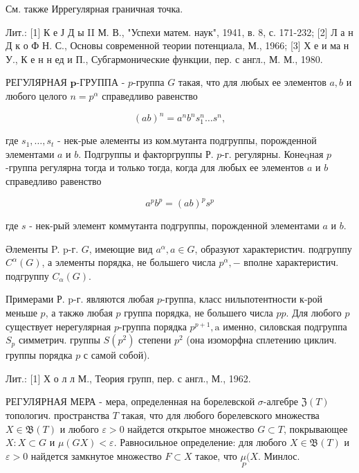 \documentclass[10pt]{article}
\begin{document}
См. также Иррегулярная граничная точка.



Лит.: [1] К е Ј Д ы II М. В., "Успехи матем. наук", 1941, в. 8, с. 171-232; [2] Л а н Д к о Ф Н. С., Основы современной теории потенциала, М., 1966; [3] Х е и ма н У., К е н н ед и П., Субгармонические функции, пер. с англ., М. М., 1980.



РЕГУЛЯРНАЯ $\boldsymbol{p}$-ГРУППА - $p$-группа $G$ такая, что для любых ее элементов $a, b$ и любого целого $n=p^{\alpha}$ справедливо равенство



\[

(a b)^{n}=a^{n} b^{n} s_{1}^{n} \ldots s^{n},

\]



где $s_{1}, \ldots, s_{t}$ - нек-рые әлементы из ком.мутанта подгруппы, порожденной элементами $a$ и $b$. Подгруппы и факторгруппы Р. $p$-г. регулярны. Конеqная $p$-группа регулярна тогда и только тогда, когда для любых ее элементов $a$ и $b$ справедливо равенство



\[

a^{p} b^{p}=(a b)^{p} s^{p}

\]



где $s$ - нек-рый элемент коммутанта подгруппы, порожденной элементами $a$ и $b$.



Әлементы P. p-г. $G$, имеющие вид $a^{\alpha}, a \in G$, образуют характеристич. подгруппу $C^{\alpha}(G)$, а элементы порядка, не большего числа $p^{\alpha},-$ вполне характеристич. подгруппу $C_{\alpha}(G)$.



Примерами Р. p-г. являются любая $p$-группа, класс нильпотентности к-рой меньше $p$, а такжө любая $p$ группа порядка, не большего числа $p p$. Для любого $p$ существует нерегулярная $p$-группа порядка $p^{p+1}, \mathrm{a}$ именно, силовская подгруппа $S_{p}$ симметрич. группы $S\left(p^{2}\right)$ степени $p^{2}$ (она изоморфна сплетению циклич. группы порядка $p$ с самой собой).



Лит.: [1] Х о л л М., Теория групп, пер. с англ., М., 1962.



РЕГУЛЯРНАЯ МЕРА - мера, определенная на борелевской $\sigma$-алгебре $\mathfrak{Z}(T)$ топологич. пространства $T$ такая, что для любого борелевского множества $X \in \mathfrak{B}(T)$ и любого $\varepsilon>0$ найдется открытое множество $G \subset T$, покрывающее $X: X \subset G$ и $\mu(G X)<\varepsilon$. Равносильное определение: для любого $X \in \mathfrak{B}(T)$ и $\varepsilon>0$ найдется замкнутое множество $F \subset X$ такое, что $\underset{P}{\mu}(X$. Минлос.
\end{document}
